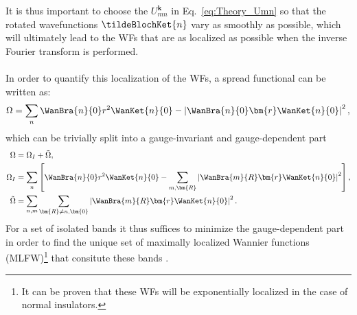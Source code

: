 It is thus important to choose the $U_{mn}^{\bm k}$ in Eq.~\eqref{eq:Theory_Umn} so that the rotated wavefunctions $\tildeBlochKet{n}$ vary as smoothly as possible, which will ultimately lead to the WFs that are as localized as possible when the inverse Fourier transform is performed.
\\\\
In order to quantify this localization of the WFs, a spread functional can be written as:
\begin{equation}
	\label{eq:Theory_spread}
	\Omega =\sum_n \WanBra{n}{0}r^2\WanKet{n}{0} - \left|\WanBra{n}{0}\bm{r}\WanKet{n}{0}\right|^2,
\end{equation}
which can be trivially split into a gauge-invariant and gauge-dependent part
\begin{align}
	\Omega &= \Omega_I + \tilde\Omega,  \\
	\Omega_I &= \sum_n \left[\WanBra{n}{0} r^2 \WanKet{n}{0} - \sum_{m,\bm{R}} \left| \WanBra{m}{R} \bm{r} \WanKet{n}{0}\right|^2\right] \label{eq:Theory_omegaI},\\
	\tilde\Omega &= \sum_{n,m} \sum_{\bm{R} \neq n,\bm{0}} \left|\WanBra{m}{R} \bm{r} \WanKet{n}{0}\right|^2.
\end{align}
For a set of isolated bands it thus suffices to minimize the gauge-dependent part in order to find the  unique set of maximally localized Wannier functions (MLFW)\footnote{It can be proven that these WFs will be exponentially localized in the case of normal insulators.} that consitute these bands \cite{Kunes2004, Marzari2012}.

